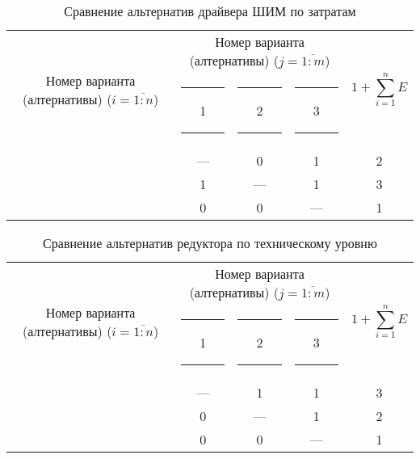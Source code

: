 \begin{table}[H]
    \centering
    \begin{tabular}{|c|c|c|c|c|}
        \hline
        \multirow{2}{2.4cm}[-0.5pc]{
            \centering
            Номер варианта (алтернативы) ($i = \overline{1:n}$)
        } &
        \multicolumn{3}{c|}{
            \parbox[t]{2.4cm}{
                \centering
                Номер варианта (алтернативы) ($j = \overline{1:m}$)
            }
        } &
        \multirow{2}{1.7cm}{
            \centering
            $$1 + \sum_{i=1}^n E$$
        } \\
        &
        \centering \rule{2pt}{0pt} 1 \rule{2pt}{0pt} &
        \centering \rule{2pt}{0pt} 2 \rule{2pt}{0pt} &
        \centering \rule{2pt}{0pt} 3 \rule{2pt}{0pt} & \\
        \hline \hline
        \centering{1} &---& 0 & 1 & 2 \\ \hline
        \centering{2} & 1 &---& 1 & 3 \\ \hline
        \centering{3} & 0 & 0 &---& 1 \\ \hline
    \end{tabular}
    \caption{Сравнение альтернатив драйвера ШИМ по затратам}
    \label{tbl_drv_cost_lvl_comparison}
\end{table}

\begin{table}[H]
    \centering
    \begin{tabular}{|c|c|c|c|c|}
        \hline
        \multirow{2}{2.4cm}[-0.5pc]{
            \centering
            Номер варианта (алтернативы) ($i = \overline{1:n}$)
        } &
        \multicolumn{3}{c|}{
            \parbox[t]{2.4cm}{
                \centering
                Номер варианта (алтернативы) ($j = \overline{1:m}$)
            }
        } &
        \multirow{2}{1.7cm}{
            \centering
            $$1 + \sum_{i=1}^n E$$
        } \\
        &
        \centering \rule{2pt}{0pt} 1 \rule{2pt}{0pt} &
        \centering \rule{2pt}{0pt} 2 \rule{2pt}{0pt} &
        \centering \rule{2pt}{0pt} 3 \rule{2pt}{0pt} & \\
        \hline \hline
        \centering{1} &---& 1 & 1 & 3 \\ \hline
        \centering{2} & 0 &---& 1 & 2 \\ \hline
        \centering{3} & 0 & 0 &---& 1 \\ \hline
    \end{tabular}
    \caption{Сравнение альтернатив редуктора по техническому уровню}
    \label{tbl_red_tech_lvl_comparison}
\end{table}

